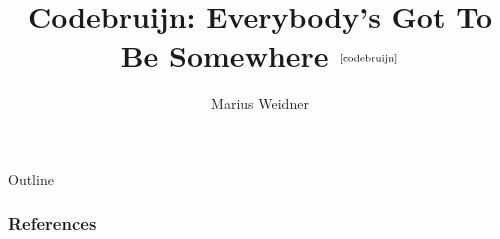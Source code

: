 \documentclass[aspectratio=169]{beamer}
\title{Codebruijn: Everybody's Got To Be Somewhere
  $^{\text{\cite{codebruijn}}}$}
\institute[Uni Freiburg]{Chair of Programming Languages, University of
  Freiburg}
\author{Marius Weidner}
\begin{document}
\begin{frame}
  \titlepage
\end{frame}

\begin{frame}{Outline}
  \tableofcontents
\end{frame}

\begin{frame}[fragile]
  \frametitle{References}
  \printbibliography
\end{frame}
\end{document}
